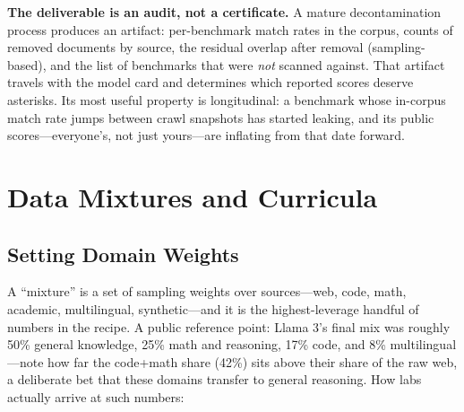 \textbf{The deliverable is an audit, not a certificate.} A mature decontamination process produces an artifact: per-benchmark match rates in the corpus, counts of removed documents by source, the residual overlap after removal (sampling-based), and the list of benchmarks that were \textit{not} scanned against. That artifact travels with the model card and determines which reported scores deserve asterisks. Its most useful property is longitudinal: a benchmark whose in-corpus match rate jumps between crawl snapshots has started leaking, and its public scores---everyone's, not just yours---are inflating from that date forward.

\section{Data Mixtures and Curricula}
\label{sec:pretrain_mixtures}

\subsection{Setting Domain Weights}

A ``mixture'' is a set of sampling weights over sources---web, code, math, academic, multilingual, synthetic---and it is the highest-leverage handful of numbers in the recipe. A public reference point: Llama 3's final mix was roughly 50\% general knowledge, 25\% math and reasoning, 17\% code, and 8\% multilingual---note how far the code+math share (42\%) sits above their share of the raw web, a deliberate bet that these domains transfer to general reasoning. How labs actually arrive at such numbers:

